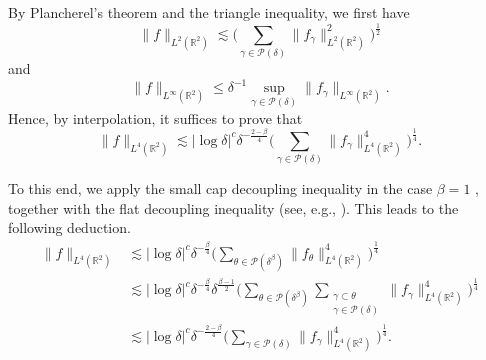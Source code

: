 \documentclass[reqno,centertags,11pt,a4paper]{amsart}
\begin{document}
By Plancherel's theorem and the triangle inequality, we first have
\begin{equation*}\label{dec-es1}
  \|f\|_{L^2(\mathbb{R}^2)} \lesssim  \bigg(\sum_{\gamma\in\mathcal{P}(\delta)}\|f_\gamma\|_{L^2(\mathbb{R}^2)}^2\bigg)^{\frac{1}{2}}
\end{equation*}
and
\begin{equation*}\label{dec-es2}
  \|f\|_{L^\infty(\mathbb{R}^2)}\leq \delta^{-1}\sup_{\gamma\in\mathcal{P}(\delta)}\|f_\gamma\|_{L^{\infty}(\mathbb{R}^2)}.
\end{equation*}
Hence, by interpolation, it suffices to prove that
\begin{equation*}\label{dec-es3}
    \|f\|_{L^4(\mathbb{R}^2)}\lesssim|\log\delta|^{c}\delta^{-\frac{2-\beta}{4}}\bigg(\sum_{\gamma\in \mathcal{P}(\delta)}\|f_\gamma\|_{L^4(\mathbb{R}^2)}^4\bigg)^{\frac{1}{4}}.
\end{equation*}

To this end, we apply the small cap decoupling inequality in the case $\beta = 1$ \cite[Theorem 1.1]{Johnsrude23}, together with the flat decoupling inequality (see, e.g., \cite[Proposition 2.4]{DGW20}). This leads to the following deduction.
\begin{align*}
\|f\|_{L^4(\mathbb{R}^2)}&\lesssim|\log\delta|^{c}\delta^{-\frac{\beta}{4}} \bigg(\sum_{\theta\in\mathcal{P}(\delta^{\beta})}\|f_\theta\|_{L^4(\mathbb{R}^2)}^4\bigg)^{\frac{1}{4}}  \\
&\lesssim|\log\delta|^{c} \delta^{-\frac{\beta}{4}} \delta^{\frac{\beta-1}{2}} \bigg(\sum_{\theta\in\mathcal{P}(\delta^{\beta})}\sum_{\substack{\gamma\subset \theta\\\gamma\in\mathcal{P}(\delta)}}\|f_\gamma\|_{L^4(\mathbb{R}^2)}^4\bigg)^{\frac{1}{4}}\\
&\lesssim|\log\delta|^{c}\delta^{-\frac{2-\beta}{4}}\bigg(\sum_{\gamma\in \mathcal{P}(\delta)}\|f_\gamma\|_{L^4(\mathbb{R}^2)}^4\bigg)^{\frac{1}{4}}.
\end{align*}
\end{document}
